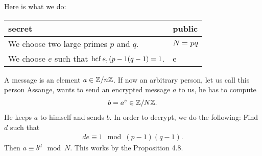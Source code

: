 Here is what we do:
\begin{center}
\begin{tabularx}{.5\textwidth}{XX}
	\toprule
	secret & public \\
	\toprule
	We choose two large primes $p$ and $q$. & $N = pq$ \\
	\midrule
	We choose $e$ such that $\operatorname{hcf} e,(p-1(q-1) = 1$. & e \\
	\bottomrule
\end{tabularx}
\end{center}
A message is an element $a \in \mathbb Z/n\mathbb Z$. If now an arbitrary person, let us call this person Assange, wants to send an encrypted message $a$ to us, he has to compute
\begin{align*}
b = a^e \in \mathbb Z/N\mathbb Z .
\end{align*}
He keeps $a$ to himself and sends $b$.
In order to decrypt, we do the following:
Find $d$ such that
\begin{align*}
de \equiv 1 \mod (p-1)(q-1).
\end{align*}
Then $a \equiv b^d \mod N$. This works by the Proposition 4.8.

